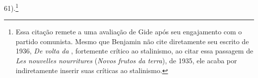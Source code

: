 61).\footnote{Essa citação remete a uma avaliação de Gide após seu
  engajamento com o partido comunista. Mesmo que Benjamin não cite
  diretamente seu escrito de 1936, \emph{De volta da} ,
  fortemente crítico ao stalinismo, ao citar essa passagem de \emph{Les
  nouvelles nourritures} (\emph{Novos frutos da terra}), de 1935, ele
  acaba por indiretamente inserir suas críticas ao stalinismo.}

